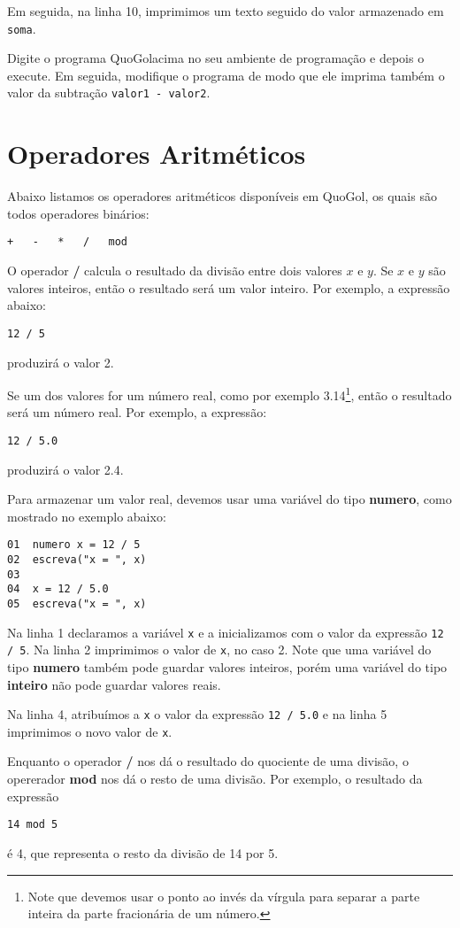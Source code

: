\documentclass{report}
\newcommand{\Qgol}{QuoGol\;}
\begin{document}
Em seguida, na linha 10, imprimimos um texto seguido do valor armazenado
em \texttt{soma}. 

Digite o programa \Qgol acima no seu ambiente de programação
e depois o execute. Em seguida, modifique o programa de modo que
ele imprima também o valor da subtração \texttt{valor1 - valor2}.



\section{Operadores Aritméticos}

Abaixo listamos os operadores aritméticos disponíveis em \Qgol,
os quais são todos operadores binários:
\begin{verbatim}
+   -   *   /   mod
\end{verbatim}


O operador \textbf{/} calcula o resultado da divisão entre dois valores
$x$ e $y$. Se $x$ e $y$ são valores inteiros, então o resultado será um
valor inteiro. Por exemplo, a expressão abaixo:
\begin{verbatim}
12 / 5
\end{verbatim}
produzirá o valor 2.

Se um dos valores for um número real, como por exemplo 3.14\footnote{Note que devemos
usar o ponto ao invés da vírgula para separar a parte inteira da parte fracionária de um número.},
então o resultado será um número real. Por exemplo, a expressão:
\begin{verbatim}
12 / 5.0
\end{verbatim}
produzirá o valor 2.4.

Para armazenar um valor real, devemos usar uma variável do tipo
\textbf{numero}, como mostrado no exemplo abaixo:
\begin{verbatim}
01  numero x = 12 / 5
02  escreva("x = ", x)
03
04  x = 12 / 5.0
05  escreva("x = ", x)
\end{verbatim}
%
Na linha 1 declaramos a variável \texttt{x} e a inicializamos
com o valor da expressão \texttt{12 / 5}. Na linha 2 imprimimos
o valor de \texttt{x}, no caso 2. Note que uma variável do tipo
\textbf{numero} também pode guardar valores inteiros, porém uma
variável do tipo \textbf{inteiro} não pode guardar valores reais.

Na linha 4, atribuímos a \texttt{x} o valor da expressão \texttt{12 / 5.0}
e na linha 5 imprimimos o novo valor de \texttt{x}.

Enquanto o operador \textbf{/} nos dá o resultado do quociente
de uma divisão, o opererador \textbf{mod} nos dá o resto de uma
divisão. Por exemplo, o resultado da expressão
\begin{verbatim}
14 mod 5
\end{verbatim}
é 4, que representa o resto da divisão de 14 por 5.
\end{document}
